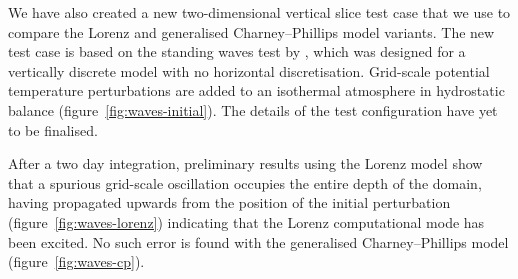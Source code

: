 \documentclass[a4paper,11pt]{article}
\begin{document}
We have also created a new two-dimensional vertical slice test case that we use to compare the Lorenz and generalised Charney--Phillips model variants.
The new test case is based on the standing waves test by \citet{arakawa-konor1996}, which was designed for a vertically discrete model with no horizontal discretisation.
Grid-scale potential temperature perturbations are added to an isothermal atmosphere in hydrostatic balance (figure~\ref{fig:waves-initial}).  The details of the test configuration have yet to be finalised.

After a two day integration, preliminary results using the Lorenz model show that a spurious grid-scale oscillation occupies the entire depth of the domain, having propagated upwards from the position of the initial perturbation (figure~\ref{fig:waves-lorenz}) indicating that the Lorenz computational mode has been excited.  No such error is found with the generalised Charney--Phillips model (figure~\ref{fig:waves-cp}).
\end{document}
